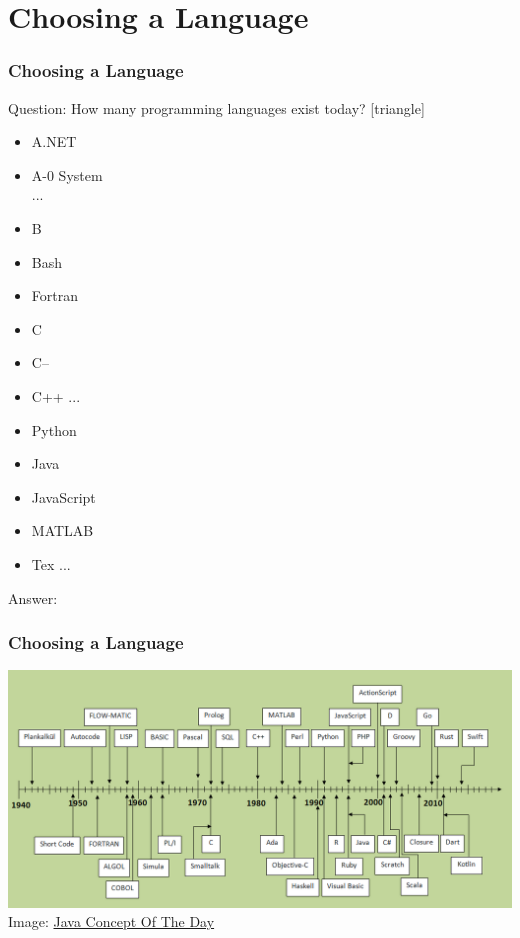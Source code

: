 \documentclass[fleqn]{beamer} %
\newcommand{\sectiontitleII}{Choosing a Language}
\begin{document}
\section{\sectiontitleII}

	\begin{frame}[label=sectionII] \small
		\frametitle{\sectiontitleII}
		
		Question: How many programming languages exist today?
		[triangle]
		\begin{multicols}{3}
		\begin{itemize}
			\item A.NET
			\item A-0 System \\
			 ...
			\item B
			\item Bash \\
			\item Fortran
			\item C
			\item C--
			\item C++
			... \\
			\item Python
			\item Java
			\item JavaScript
			\item MATLAB
			\item Tex
			... \\
		\end{itemize}
		\end{multicols}
		Answer: 
		
	\end{frame}

	\begin{frame} \small
		\frametitle{\sectiontitleII}
		
		\includegraphics[scale=.4]{TimelineOfProgrammingLanguages.png} \\
		
		\tiny{Image: \href{https://javaconceptoftheday.com/history-of-programming-languages/}{Java Concept Of The Day}}
		
	\end{frame}	
\end{document}
